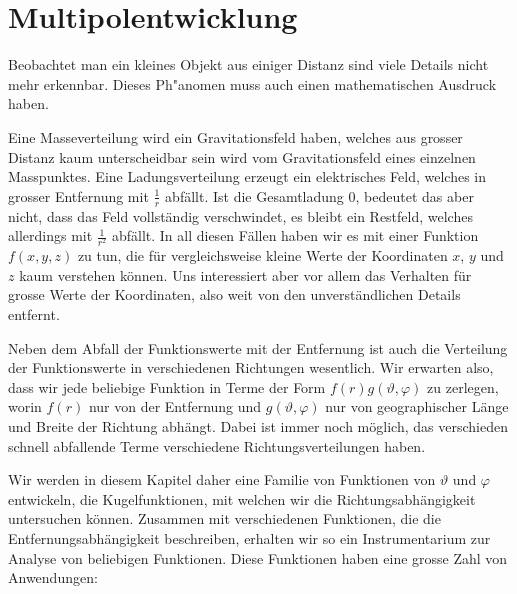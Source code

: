 %
%
%
\chapter{Multipolentwicklung
\label{skript:chapter:multipol}}
\rhead{}
Beobachtet man ein kleines Objekt aus einiger Distanz sind viele
Details nicht mehr erkennbar.
Dieses Ph"anomen muss auch einen mathematischen Ausdruck haben.

Eine Masseverteilung wird ein Gravitationsfeld haben, welches aus
grosser Distanz kaum unterscheidbar sein wird vom Gravitationsfeld
eines einzelnen Masspunktes.
Eine Ladungsverteilung erzeugt ein elektrisches Feld, welches in
grosser Entfernung mit $\frac1r$ abfällt.
Ist die Gesamtladung $0$, bedeutet das aber nicht, dass das
Feld vollständig verschwindet, es bleibt ein Restfeld, welches
allerdings mit $\frac1{r^2}$ abfällt.
In all diesen Fällen haben wir es mit einer Funktion $f(x,y,z)$ zu tun,
die für vergleichsweise kleine Werte der Koordinaten $x$, $y$ und $z$
kaum verstehen können.
Uns interessiert aber vor allem das Verhalten für grosse Werte der
Koordinaten, also weit von den unverständlichen Details entfernt.

Neben dem Abfall der Funktionswerte mit der Entfernung ist auch
die Verteilung der Funktionswerte in verschiedenen Richtungen wesentlich.
Wir erwarten also, dass wir jede beliebige Funktion in Terme der Form
$
f(r) g(\vartheta,\varphi)
$
zu zerlegen, worin $f(r)$ nur von der Entfernung und $g(\vartheta,\varphi)$
nur von geographischer Länge und Breite der Richtung abhängt.
Dabei ist immer noch möglich, das verschieden schnell abfallende
Terme verschiedene Richtungsverteilungen haben.

Wir werden in diesem Kapitel daher eine Familie von Funktionen
von $\vartheta$ und $\varphi$ entwickeln, die Kugelfunktionen,
mit welchen wir die Richtungsabhängigkeit untersuchen können.
Zusammen mit verschiedenen Funktionen, die die Entfernungsabhängigkeit
beschreiben, erhalten wir so ein Instrumentarium zur Analyse von
beliebigen Funktionen.
Diese Funktionen haben eine grosse Zahl von Anwendungen:

